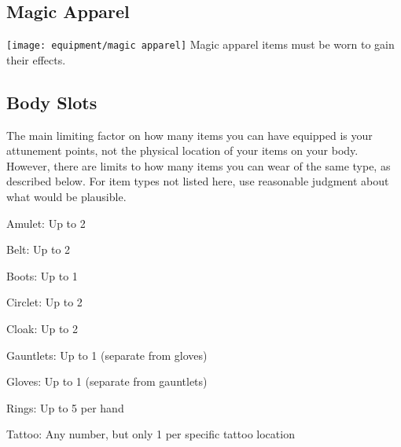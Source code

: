 \begin{longcolumn}
  \section{Magic Apparel}
    \begin{longtablepreface}
      \texttt{[image: equipment/magic apparel]}
      Magic apparel items must be worn to gain their effects.

      \subsection{Body Slots}\label{Body Slots}
        The main limiting factor on how many items you can have equipped is your attunement points, not the physical location of your items on your body.
        However, there are limits to how many items you can wear of the same type, as described below.
        For item types not listed here, use reasonable judgment about what would be plausible.
        \begin{raggeditemize}
          \item Amulet: Up to 2
          \item Belt: Up to 2
          \item Boots: Up to 1
          \item Circlet: Up to 2
          \item Cloak: Up to 2
          \item Gauntlets: Up to 1 (separate from gloves)
          \item Gloves: Up to 1 (separate from gauntlets)
          \item Rings: Up to 5 per hand
          \item Tattoo: Any number, but only 1 per specific tattoo location
        \end{raggeditemize}
    \end{longtablepreface}

    

\end{longcolumn}



\newpage
{}

